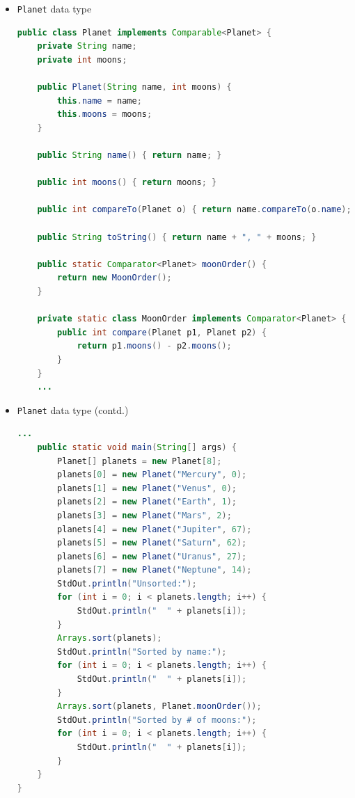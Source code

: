 \documentclass[8pt,a4paper,compress]{beamer}
\begin{document}
\begin{frame}[fragile]
\begin{itemize}
\item \lstinline{Planet} data type
\begin{lstlisting}[language=Java]
public class Planet implements Comparable<Planet> {
    private String name;
    private int moons;

    public Planet(String name, int moons) {
        this.name = name;
        this.moons = moons;
    }
    
    public String name() { return name; }

    public int moons() { return moons; }

    public int compareTo(Planet o) { return name.compareTo(o.name); }
    
    public String toString() { return name + ", " + moons; }

    public static Comparator<Planet> moonOrder() { 
        return new MoonOrder(); 
    }

    private static class MoonOrder implements Comparator<Planet> {
        public int compare(Planet p1, Planet p2) {
            return p1.moons() - p2.moons();
        }
    }
    ...
\end{lstlisting}
\end{itemize}
\end{frame}

\begin{frame}[fragile]
\begin{itemize}
\item \lstinline{Planet} data type (contd.)
\begin{lstlisting}[language=Java]
    ...
    public static void main(String[] args) {
        Planet[] planets = new Planet[8];
        planets[0] = new Planet("Mercury", 0);
        planets[1] = new Planet("Venus", 0);
        planets[2] = new Planet("Earth", 1);
        planets[3] = new Planet("Mars", 2);
        planets[4] = new Planet("Jupiter", 67);
        planets[5] = new Planet("Saturn", 62);
        planets[6] = new Planet("Uranus", 27);
        planets[7] = new Planet("Neptune", 14);
        StdOut.println("Unsorted:");
        for (int i = 0; i < planets.length; i++) {
            StdOut.println("  " + planets[i]);
        }
        Arrays.sort(planets);
        StdOut.println("Sorted by name:");
        for (int i = 0; i < planets.length; i++) {
            StdOut.println("  " + planets[i]);
        }
        Arrays.sort(planets, Planet.moonOrder());
        StdOut.println("Sorted by # of moons:");
        for (int i = 0; i < planets.length; i++) {
            StdOut.println("  " + planets[i]);
        }
    }
}
\end{lstlisting}
\end{itemize}
\end{frame}
\end{document}
